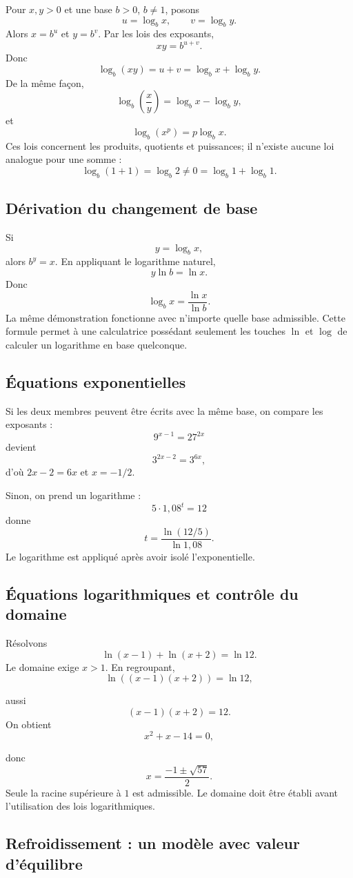 Pour $x,y>0$ et une base $b>0$, $b\ne1$, posons
\[
u=\log_bx,
\qquad v=\log_by.
\]
Alors $x=b^u$ et $y=b^v$. Par les lois des exposants,
\[
xy=b^{u+v}.
\]
Donc
\[
\log_b(xy)=u+v=\log_bx+\log_by.
\]
De la même façon,
\[
\log_b\left(\frac xy\right)=\log_bx-\log_by,
\]
et
\[
\log_b(x^p)=p\log_bx.
\]
Ces lois concernent les produits, quotients et puissances; il n'existe aucune loi analogue pour une somme :
\[
\log_b(1+1)=\log_b2\ne0=\log_b1+\log_b1.
\]

\subsection{Dérivation du changement de base}

Si
\[
y=\log_bx,
\]
alors $b^y=x$. En appliquant le logarithme naturel,
\[
y\ln b=\ln x.
\]
Donc
\[
\log_bx=\frac{\ln x}{\ln b}.
\]
La même démonstration fonctionne avec n'importe quelle base admissible. Cette formule permet à une calculatrice possédant seulement les touches $\ln$ et $\log$ de calculer un logarithme en base quelconque.

\subsection{Équations exponentielles}

Si les deux membres peuvent être écrits avec la même base, on compare les exposants :
\[
9^{x-1}=27^{2x}
\]
devient
\[
3^{2x-2}=3^{6x},
\]
d'où $2x-2=6x$ et $x=-1/2$.

Sinon, on prend un logarithme :
\[
5\cdot1{,}08^t=12
\]
donne
\[
t=\frac{\ln(12/5)}{\ln1{,}08}.
\]
Le logarithme est appliqué après avoir isolé l'exponentielle.

\subsection{Équations logarithmiques et contrôle du domaine}

Résolvons
\[
\ln(x-1)+\ln(x+2)=\ln12.
\]
Le domaine exige $x>1$. En regroupant,
\[
\ln((x-1)(x+2))=\ln12,
\]

aussi
\[
(x-1)(x+2)=12.
\]
On obtient
\[
x^2+x-14=0,
\]

donc
\[
x=\frac{-1\pm\sqrt{57}}2.
\]
Seule la racine supérieure à $1$ est admissible. Le domaine doit être établi avant l'utilisation des lois logarithmiques.

\subsection{Refroidissement : un modèle avec valeur d'équilibre}

